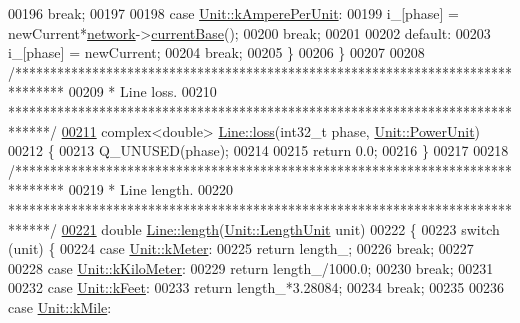\begin{DoxyCode}
00196     \textcolor{keywordflow}{break};
00197 
00198   \textcolor{keywordflow}{case} \hyperlink{class_unit_a0794cf6c9682f48296dd4a5315389787aeed3b50e464d581cb630181a3b6a0709}{Unit::kAmperePerUnit}:
00199     i\_[phase] = newCurrent*\hyperlink{class_line_aefdf6a6c3e3775b5a16b344c1d33964e}{network}->\hyperlink{group___graphics_ga433bc5c32cf2ce5329bb40b21952d885}{currentBase}();
00200     \textcolor{keywordflow}{break};
00201 
00202   \textcolor{keywordflow}{default}:
00203     i\_[phase] = newCurrent;
00204     \textcolor{keywordflow}{break};
00205   \}
00206 \}
00207 
00208 \textcolor{comment}{/*******************************************************************************}
00209 \textcolor{comment}{ * Line loss.}
00210 \textcolor{comment}{ ******************************************************************************/}
\hypertarget{line_8cpp_source_l00211}{}\hyperlink{group___models_ga7909d69e419de3f460ca7abab3d91e53}{00211} complex<double> \hyperlink{group___models_ga7909d69e419de3f460ca7abab3d91e53}{Line::loss}(int32\_t phase, \hyperlink{class_unit_ace265ae255370ccacfd5370337572c3b}{Unit::PowerUnit})
00212 \{
00213   Q\_UNUSED(phase);
00214 
00215   \textcolor{keywordflow}{return} 0.0;
00216 \}
00217 
00218 \textcolor{comment}{/*******************************************************************************}
00219 \textcolor{comment}{ * Line length.}
00220 \textcolor{comment}{ ******************************************************************************/}
\hypertarget{line_8cpp_source_l00221}{}\hyperlink{group___models_gae2e4500d0fa60dcc2ecb08b2c96954f9}{00221} \textcolor{keywordtype}{double} \hyperlink{group___models_gae2e4500d0fa60dcc2ecb08b2c96954f9}{Line::length}(\hyperlink{class_unit_a8c8921f7b225ad6063b1cb573425b9a0}{Unit::LengthUnit} unit)
00222 \{
00223   \textcolor{keywordflow}{switch} (unit) \{
00224   \textcolor{keywordflow}{case} \hyperlink{class_unit_a8c8921f7b225ad6063b1cb573425b9a0abfa41ebe7ee649a1f02c9b8ae570434b}{Unit::kMeter}:
00225     \textcolor{keywordflow}{return} length\_;
00226     \textcolor{keywordflow}{break};
00227 
00228   \textcolor{keywordflow}{case} \hyperlink{class_unit_a8c8921f7b225ad6063b1cb573425b9a0a1c04f3dd196dbe1832a2658215b0d919}{Unit::kKiloMeter}:
00229     \textcolor{keywordflow}{return} length\_/1000.0;
00230     \textcolor{keywordflow}{break};
00231 
00232   \textcolor{keywordflow}{case} \hyperlink{class_unit_a8c8921f7b225ad6063b1cb573425b9a0a9ac9b167b0ebce477fb53d6ace04ddc8}{Unit::kFeet}:
00233     \textcolor{keywordflow}{return} length\_*3.28084;
00234     \textcolor{keywordflow}{break};
00235 
00236   \textcolor{keywordflow}{case} \hyperlink{class_unit_a8c8921f7b225ad6063b1cb573425b9a0a2ebde742068bbee0510de32fbb4cd724}{Unit::kMile}:

\end{DoxyCode}
